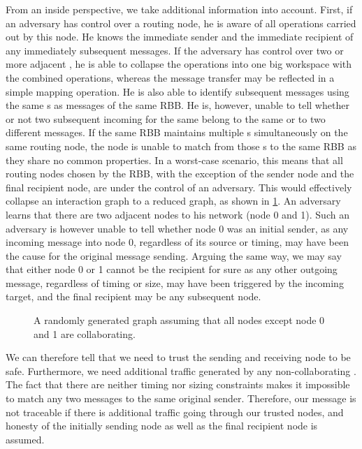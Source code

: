 From an inside perspective, we take additional information into account. First, if an adversary has control over a routing node, he is aware of all operations carried out by this node. He knows the immediate sender and the immediate recipient of any immediately subsequent messages. If the adversary has control over two or more adjacent \VortexNodes{}, he is able to collapse the operations into one big workspace with the combined operations, whereas the message transfer may be reflected in a simple mapping operation. He is also able to identify subsequent messages using the same s as messages of the same RBB. He is, however, unable to tell whether or not two subsequent incoming \VortexMessages{} for the same  belong to the same or to two different messages. If the same RBB maintains multiple s simultaneously on the same routing node, the node is unable to match from those s to the same RBB as they share no common properties. In a worst-case scenario, this means that all routing nodes chosen by the RBB, with the exception of the sender node and the final recipient node,  are under the control of an adversary. This would effectively collapse an interaction graph to a reduced graph, as shown in \cref{fig:reducedMessageGraphPaths}. An adversary learns that there are two adjacent nodes to his network (node 0 and 1). Such an adversary is however unable to tell whether node 0 was an initial sender, as any incoming message into node 0, regardless of its source or timing, may have been the cause for the original message sending. Arguing the same way, we may say that either node 0 or 1 cannot be the recipient for sure as any other outgoing message, regardless of timing or size, may have been triggered by the incoming target, and the final recipient may be any subsequent node.

\begin{figure}[!t]\centering
	\resizebox{.9\linewidth}{!}{
		
	}
	\caption{A randomly generated graph assuming that all nodes except node 0 and 1 are collaborating.}
	\label{fig:reducedMessageGraphPaths}
\end{figure}

We can therefore tell that we need to trust the sending and receiving node to be safe. Furthermore, we need additional traffic generated by any non-collaborating \VortexNode{}. The fact that there are neither timing nor sizing constraints makes it impossible to match any two messages to the same original sender. Therefore, our message is not traceable if there is additional traffic going through our trusted nodes, and honesty of the initially sending node as well as the final recipient node is assumed.

